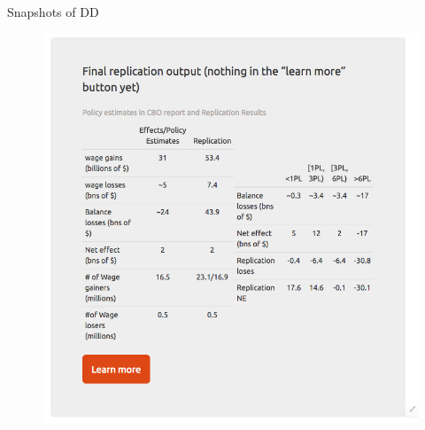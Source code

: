 \documentclass{beamer}
\begin{document}
\begin{frame}[plain]{Snapshots of DD}
\vspace{-2em}
\begin{figure}[h!]
\centering
\hspace{-5em} \includegraphics[scale = 0.28]{../Images/Screen_Shot6}
\hyperlink{demo}{\beamerbutton{}}
\end{figure}	
\end{frame}
\end{document}
